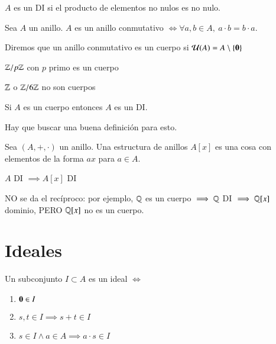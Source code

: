 \begin{pro}
	$A$ es un DI si el producto de elementos no nulos es no nulo.
\end{pro}

\begin{dfn}
	Sea $A$ un anillo. $A$ es un anillo conmutativo $\iff \forall a, b \in A,\ a\cdot b = b \cdot a$.
\end{dfn}

\begin{dfn}[Cuerpo]
	Diremos que un anillo conmutativo es un cuerpo si $\mathcal{U}(A) = A \setminus \{\mathbf{0}\}$
\end{dfn}

\begin{ej}
	\item $\mathbb{Z}/p\mathbb{Z}$ con $p$ primo es un cuerpo
	\item $\mathbb{Z}$ o $\mathbb{Z}/6\mathbb{Z}$ no son cuerpos
\end{ej}

\begin{pro}
	Si $A$ es un cuerpo entonces $A$ es un DI.
\end{pro}


Hay que buscar una buena definición para esto.
\begin{dfn}
	Sea $(A, +, \cdot)$ un anillo. Una estructura de anillos $A[x]$ es una cosa con elementos de la forma $ax$ para $a \in A$.
\end{dfn}

\begin{pro}
	$A$ DI $\implies A[x]$ DI
\end{pro}

\begin{obs}
	NO se da el recíproco: por ejemplo, $\mathbb{Q}$ es un cuerpo $\implies \mathbb{Q}$ DI $\implies \mathbb{Q}[x]$ dominio, PERO $\mathbb{Q}[x]$ no es un cuerpo.
\end{obs}

\section{Ideales}

\begin{dfn}[Ideal]
	Un subconjunto $I \subset A$ es un ideal $\iff$
	\begin{enumerate}
		\item $\mathbf{0} \in I$
		\item $s,t \in I \implies s+t \in I$
		\item $s \in I \land a \in A \implies a \cdot s \in I$
	\end{enumerate}
\end{dfn}

